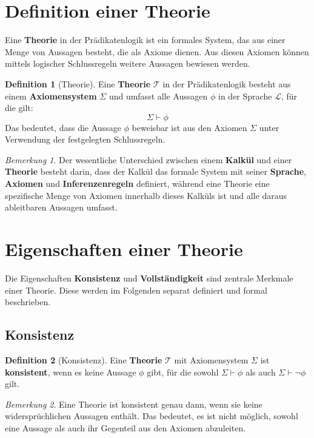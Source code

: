 \documentclass{book}
\theoremstyle{plain}
\theoremstyle{remark}
\newtheorem*{remark}{Bemerkung}
\theoremstyle{definition}
\newtheorem{definition}{Definition}[section]
\begin{document}
\section{Definition einer Theorie}

Eine \textbf{Theorie} in der Prädikatenlogik ist ein formales System, das aus einer Menge von Aussagen besteht, die als Axiome dienen. Aus diesen Axiomen können mittels logischer Schlussregeln weitere Aussagen bewiesen werden.

\begin{definition}[Theorie]
Eine \textbf{Theorie} \(\mathcal{T}\) in der Prädikatenlogik besteht aus einem \textbf{Axiomensystem} \(\Sigma\) und umfasst alle Aussagen \(\phi\) in der Sprache \(\mathcal{L}\), für die gilt:
\[
\Sigma \vdash \phi
\]
Das bedeutet, dass die Aussage \(\phi\) beweisbar ist aus den Axiomen \(\Sigma\) unter Verwendung der festgelegten Schlussregeln.
\end{definition}

\begin{remark}
Der wesentliche Unterschied zwischen einem \textbf{Kalkül} und einer \textbf{Theorie} besteht darin, dass der Kalkül das formale System mit seiner \textbf{Sprache}, \textbf{Axiomen} und \textbf{Inferenzenregeln} definiert, während eine Theorie eine spezifische Menge von Axiomen innerhalb dieses Kalküls ist und alle daraus ableitbaren Aussagen umfasst.
\end{remark}

\section{Eigenschaften einer Theorie}

Die Eigenschaften \textbf{Konsistenz} und \textbf{Vollständigkeit} sind zentrale Merkmale einer Theorie. Diese werden im Folgenden separat definiert und formal beschrieben.

\subsection{Konsistenz}

\begin{definition}[Konsistenz]
Eine \textbf{Theorie} \(\mathcal{T}\) mit Axiomensystem \(\Sigma\) ist \textbf{konsistent}, wenn es keine Aussage \(\phi\) gibt, für die sowohl \(\Sigma \vdash \phi\) als auch \(\Sigma \vdash \neg \phi\) gilt.
\end{definition}

\begin{remark}
Eine Theorie ist konsistent genau dann, wenn sie keine widersprüchlichen Aussagen enthält. Das bedeutet, es ist nicht möglich, sowohl eine Aussage als auch ihr Gegenteil aus den Axiomen abzuleiten.
\end{remark}
\end{document}
